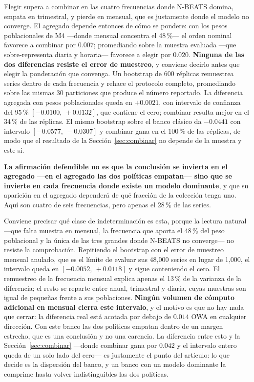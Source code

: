 Elegir supera a combinar en las cuatro frecuencias donde N-BEATS domina, empata en
trimestral, y pierde en mensual, que es justamente donde el modelo no converge. El
agregado depende entonces de cómo se pondere: con los pesos poblacionales de M4 ---donde
mensual concentra el 48\,\%--- el orden nominal favorece a combinar por $0.007$;
promediando sobre la muestra evaluada ---que sobre-representa diaria y horaria---
favorece a elegir por $0.020$. \textbf{Ninguna de las dos diferencias resiste el error de
muestreo}, y conviene decirlo antes que elegir la ponderación que convenga. Un bootstrap
de 600 réplicas remuestrea series dentro de cada frecuencia y rehace el protocolo
completo, promediando sobre las mismas 30 particiones que produce el número reportado.
La diferencia agregada con pesos poblacionales queda en $+0.0021$, con intervalo de
confianza del 95\,\% $[-0.0100,\ +0.0132]$, que contiene el cero; combinar resulta mejor
en el 34\,\% de las réplicas. El mismo bootstrap sobre el banco clásico da $-0.0441$ con
intervalo $[-0.0577,\ -0.0307]$ y combinar gana en el 100\,\% de las réplicas, de modo
que el resultado de la Sección~\ref{sec:combinar} no depende de la muestra y este sí.

\textbf{La afirmación defendible no es que la conclusión se invierta en el agregado
---en el agregado las dos políticas empatan--- sino que se invierte en cada frecuencia
donde existe un modelo dominante}, y que su aparición en el agregado dependerá de qué
fracción de la colección tenga uno. Aquí son cuatro de seis frecuencias, pero apenas el
28\,\% de las series.

Conviene precisar qué clase de indeterminación es esta, porque la lectura natural
---que falta muestra en mensual, la frecuencia que aporta el 48\,\% del peso
poblacional y la única de las tres grandes donde N-BEATS no converge--- no resiste la
comprobación. Repitiendo el bootstrap con el error de muestreo mensual anulado, que es
el límite de evaluar sus 48{,}000 series en lugar de 1{,}000, el intervalo queda en
$[-0.0052,\ +0.0118]$ y sigue conteniendo el cero. El remuestreo de la frecuencia
mensual explica apenas el 13\,\% de la varianza de la diferencia; el resto se reparte
entre anual, trimestral y diaria, cuyas muestras son igual de pequeñas frente a sus
poblaciones. \textbf{Ningún volumen de cómputo adicional en mensual cierra este
intervalo}, y el motivo es que no hay nada que cerrar: la diferencia real está acotada
por debajo de $0.014$ OWA en cualquier dirección. Con este banco las dos políticas
empatan dentro de un margen estrecho, que es una conclusión y no una carencia. La
diferencia entre esto y la Sección~\ref{sec:combinar} ---donde combinar gana por
$0.042$ y el intervalo entero queda de un solo lado del cero--- es justamente el punto del
artículo: lo que decide es la dispersión del banco, y un banco con un modelo dominante
la comprime hasta volver indistinguibles las dos políticas.

